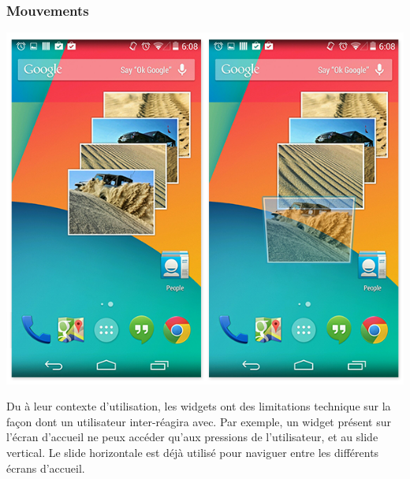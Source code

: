 \documentclass{beamer}
\begin{document}
\begin{frame}
\frametitle{Mouvements}
\begin{center}
\includegraphics[scale=0.2]{widgets_gestures.png}
\end{center}
Du à leur contexte d'utilisation, les widgets ont des limitations technique sur la façon dont un utilisateur inter-réagira avec. Par exemple, un widget présent sur l'écran d’accueil ne peux accéder qu'aux pressions de l'utilisateur, et au slide vertical. Le slide horizontale est déjà utilisé pour naviguer entre les différents écrans d’accueil.
\end{frame}
\end{document}
